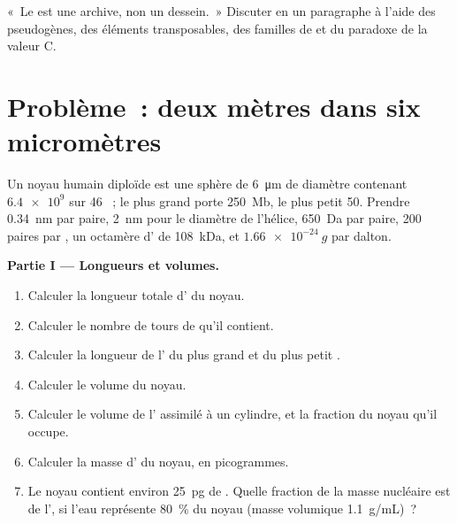 \begin{exercise}[$\star\star\star$]\label{exo:b1:genomes:12}
«~Le  est une archive, non un dessein.~» Discuter en un
paragraphe à l'aide des pseudogènes, des éléments transposables, des
familles de  et du paradoxe de la valeur C.
\end{exercise}

\section{Problème~: deux mètres dans six micromètres}

\begin{problem}
\label{pb:b1:genomes:1}
Un noyau humain diploïde est une sphère de \qty{6}{\micro m} de diamètre
contenant $\num{6.4e9}$  sur 46 ~; le plus
grand  porte \qty{250}{Mb}, le plus petit \qty{50}{}. Prendre
\qty{0.34}{nm} par paire, \qty{2}{nm} pour le diamètre de l'hélice,
\qty{650}{Da} par paire, \num{200} paires par , un octamère
d' de \qty{108}{kDa}, et $\qty{1.66e-24}{g}$ par dalton.

\medskip
\noindent\textbf{Partie I --- Longueurs et volumes.}
\begin{enumerate}
  \item Calculer la longueur totale d' du noyau.
  \item Calculer le nombre de tours de  qu'il contient.
  \item Calculer la longueur de l' du plus grand et du plus petit
        .
  \item Calculer le volume du noyau.
  \item Calculer le volume de l' assimilé à un cylindre, et la
        fraction du noyau qu'il occupe.
  \item Calculer la masse d' du noyau, en picogrammes.
  \item Le noyau contient environ \qty{25}{pg} de . Quelle
        fraction de la masse nucléaire est de l', si l'eau représente
        \qty{80}{\%} du noyau (masse volumique \qty{1.1}{g/mL})~?
\end{enumerate}


\end{problem}
